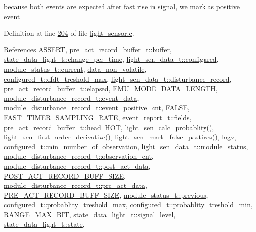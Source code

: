 because both events are expected after fast rise in signal, we mark as positive event 

Definition at line \hyperlink{a00047_source_l00204}{204} of file \hyperlink{a00047_source}{light\+\_\+sensor.\+c}.



References \hyperlink{a00072_source_l00059}{A\+S\+S\+E\+R\+T}, \hyperlink{a00022_source_l00137}{pre\+\_\+act\+\_\+record\+\_\+buffer\+\_\+t\+::buffer}, \hyperlink{a00017_source_l00148}{state\+\_\+data\+\_\+light\+\_\+t\+::change\+\_\+per\+\_\+time}, \hyperlink{a00024_source_l00041}{light\+\_\+sen\+\_\+data\+\_\+t\+::configured}, \hyperlink{a00017_source_l00156}{module\+\_\+status\+\_\+t\+::current}, \hyperlink{a00060_source_l00016}{data\+\_\+non\+\_\+volatile}, \hyperlink{a00021_source_l00190}{configured\+\_\+t\+::dfdt\+\_\+treshold\+\_\+max}, \hyperlink{a00024_source_l00046}{light\+\_\+sen\+\_\+data\+\_\+t\+::disturbance\+\_\+record}, \hyperlink{a00022_source_l00140}{pre\+\_\+act\+\_\+record\+\_\+buffer\+\_\+t\+::elapsed}, \hyperlink{a00022_source_l00015}{E\+M\+U\+\_\+\+M\+O\+D\+E\+\_\+\+D\+A\+T\+A\+\_\+\+L\+E\+N\+G\+T\+H}, \hyperlink{a00022_source_l00228}{module\+\_\+disturbance\+\_\+record\+\_\+t\+::event\+\_\+data}, \hyperlink{a00022_source_l00182}{module\+\_\+disturbance\+\_\+record\+\_\+t\+::event\+\_\+positive\+\_\+cnt}, \hyperlink{a00040_source_l00086}{F\+A\+L\+S\+E}, \hyperlink{a00021_source_l00098}{F\+A\+S\+T\+\_\+\+T\+I\+M\+E\+R\+\_\+\+S\+A\+M\+P\+L\+I\+N\+G\+\_\+\+R\+A\+T\+E}, \hyperlink{a00021_a5296d090c085b0421fdf5a86e382abea}{event\+\_\+report\+\_\+t\+::fields}, \hyperlink{a00022_source_l00142}{pre\+\_\+act\+\_\+record\+\_\+buffer\+\_\+t\+::head}, \hyperlink{a00021_source_l00153}{H\+O\+T}, \hyperlink{a00047_source_l00184}{light\+\_\+sen\+\_\+calc\+\_\+probablity()}, \hyperlink{a00047_source_l00172}{light\+\_\+sen\+\_\+first\+\_\+order\+\_\+derivative()}, \hyperlink{a00047_source_l00491}{light\+\_\+sen\+\_\+mark\+\_\+false\+\_\+postives()}, \hyperlink{a00038_source_l00036}{logv}, \hyperlink{a00021_source_l00200}{configured\+\_\+t\+::min\+\_\+number\+\_\+of\+\_\+observation}, \hyperlink{a00024_source_l00050}{light\+\_\+sen\+\_\+data\+\_\+t\+::module\+\_\+status}, \hyperlink{a00022_source_l00180}{module\+\_\+disturbance\+\_\+record\+\_\+t\+::observation\+\_\+cnt}, \hyperlink{a00022_source_l00177}{module\+\_\+disturbance\+\_\+record\+\_\+t\+::post\+\_\+act\+\_\+data}, \hyperlink{a00022_source_l00014}{P\+O\+S\+T\+\_\+\+A\+C\+T\+\_\+\+R\+E\+C\+O\+R\+D\+\_\+\+B\+U\+F\+F\+\_\+\+S\+I\+Z\+E}, \hyperlink{a00022_source_l00176}{module\+\_\+disturbance\+\_\+record\+\_\+t\+::pre\+\_\+act\+\_\+data}, \hyperlink{a00022_source_l00013}{P\+R\+E\+\_\+\+A\+C\+T\+\_\+\+R\+E\+C\+O\+R\+D\+\_\+\+B\+U\+F\+F\+\_\+\+S\+I\+Z\+E}, \hyperlink{a00017_source_l00157}{module\+\_\+status\+\_\+t\+::previous}, \hyperlink{a00021_source_l00202}{configured\+\_\+t\+::probablity\+\_\+treshold\+\_\+max}, \hyperlink{a00021_source_l00201}{configured\+\_\+t\+::probablity\+\_\+treshold\+\_\+min}, \hyperlink{a00021_source_l00014}{R\+A\+N\+G\+E\+\_\+\+M\+A\+X\+\_\+B\+I\+T}, \hyperlink{a00017_source_l00147}{state\+\_\+data\+\_\+light\+\_\+t\+::signal\+\_\+level}, \hyperlink{a00017_source_l00150}{state\+\_\+data\+\_\+light\+\_\+t\+::state}, 